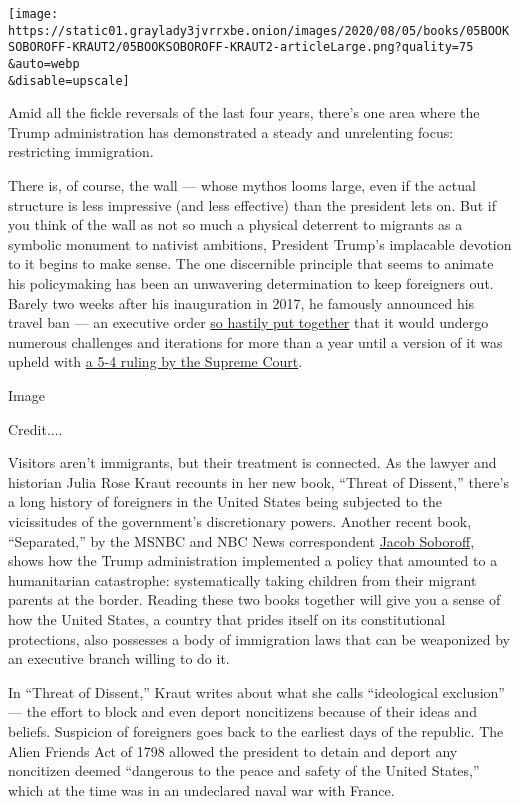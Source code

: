 \texttt{[image: https://static01.graylady3jvrrxbe.onion/images/2020/08/05/books/05BOOKSOBOROFF-KRAUT2/05BOOKSOBOROFF-KRAUT2-articleLarge.png?quality=75\\\&auto=webp\\\&disable=upscale]}

Amid all the fickle reversals of the last four years, there's one area
where the Trump administration has demonstrated a steady and unrelenting
focus: restricting immigration.

There is, of course, the wall --- whose mythos looms large, even if the
actual structure is less impressive (and less effective) than the
president lets on. But if you think of the wall as not so much a
physical deterrent to migrants as a symbolic monument to nativist
ambitions, President Trump's implacable devotion to it begins to make
sense. The one discernible principle that seems to animate his
policymaking has been an unwavering determination to keep foreigners
out. Barely two weeks after his inauguration in 2017, he famously
announced his travel ban --- an executive order
\href{https://www.nytimes3xbfgragh.onion/2017/02/05/us/politics/donald-trump-mike-pence-travel-ban-judge.html}{so
hastily put together} that it would undergo numerous challenges and
iterations for more than a year until a version of it was upheld with
\href{https://www.nytimes3xbfgragh.onion/2018/06/26/us/politics/supreme-court-trump-travel-ban.html}{a
5-4 ruling by the Supreme Court}.

Image

Credit....

Visitors aren't immigrants, but their treatment is connected. As the
lawyer and historian Julia Rose Kraut recounts in her new book, ``Threat
of Dissent,'' there's a long history of foreigners in the United States
being subjected to the vicissitudes of the government's discretionary
powers. Another recent book, ``Separated,'' by the MSNBC and NBC News
correspondent
\href{https://www.nytimes3xbfgragh.onion/2020/07/23/books/review/separated-jacob-soboroff.html}{Jacob
Soboroff}, shows how the Trump administration implemented a policy that
amounted to a humanitarian catastrophe: systematically taking children
from their migrant parents at the border. Reading these two books
together will give you a sense of how the United States, a country that
prides itself on its constitutional protections, also possesses a body
of immigration laws that can be weaponized by an executive branch
willing to do it.

In ``Threat of Dissent,'' Kraut writes about what she calls
``ideological exclusion'' --- the effort to block and even deport
noncitizens because of their ideas and beliefs. Suspicion of foreigners
goes back to the earliest days of the republic. The Alien Friends Act of
1798 allowed the president to detain and deport any noncitizen deemed
``dangerous to the peace and safety of the United States,'' which at the
time was in an undeclared naval war with France.

